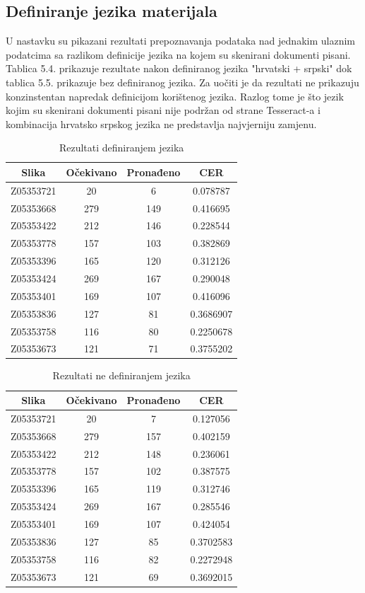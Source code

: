 \documentclass[times, utf8, zavrsni, numeric]{fer}
\begin{document}
\subsection{Definiranje jezika materijala}
U nastavku su pikazani rezultati prepoznavanja podataka nad jednakim ulaznim podatcima sa razlikom definicije jezika na kojem su skenirani dokumenti pisani. Tablica 5.4. prikazuje rezultate nakon definiranog jezika "hrvatski + srpski" dok tablica 5.5. prikazuje bez definiranog jezika. Za uočiti je da rezultati ne prikazuju konzinstentan napredak definicijom korištenog jezika. Razlog tome je što jezik kojim su skenirani dokumenti pisani nije podržan od strane Tesseract-a i kombinacija hrvatsko srpskog jezika ne predstavlja najvjerniju zamjenu.
\begin{table}[H]
	\caption{Rezultati definiranjem jezika}
        \label{tbl:Blur 2}
        \centering
        \begin{tabular}{ |*{4}{c|} } \hline
	\multicolumn{1}{|c|}{Slika} & \multicolumn{1}{|c|}{Očekivano} & \multicolumn{1}{|c|}{Pronađeno} & \multicolumn{1}{|c|}{CER}\\ \hline
Z05353721&20&6&0.078787\\ \hline
Z05353668&279&149&0.416695\\ \hline
Z05353422&212&146&0.228544\\ \hline
Z05353778&157&103&0.382869\\ \hline
Z05353396&165&120&0.312126\\ \hline
Z05353424&269&167&0.290048\\ \hline
Z05353401&169&107&0.416096\\ \hline
Z05353836&127&81&0.3686907\\ \hline
Z05353758&116&80&0.2250678\\ \hline
Z05353673&121&71&0.3755202\\ \hline
	\end{tabular}
\end{table}

\begin{table}[H]
	\caption{Rezultati ne definiranjem jezika}
        \label{tbl:Blur 2}
        \centering
        \begin{tabular}{ |*{4}{c|} } \hline
	\multicolumn{1}{|c|}{Slika} & \multicolumn{1}{|c|}{Očekivano} & \multicolumn{1}{|c|}{Pronađeno} & \multicolumn{1}{|c|}{CER}\\ \hline
Z05353721&20&7&0.127056\\ \hline
Z05353668&279&157&0.402159\\ \hline
Z05353422&212&148&0.236061\\ \hline
Z05353778&157&102&0.387575\\ \hline
Z05353396&165&119&0.312746\\ \hline
Z05353424&269&167&0.285546\\ \hline
Z05353401&169&107&0.424054\\ \hline
Z05353836&127&85&0.3702583\\ \hline
Z05353758&116&82&0.2272948\\ \hline
Z05353673&121&69&0.3692015\\ \hline
	\end{tabular}
\end{table}
\end{document}

